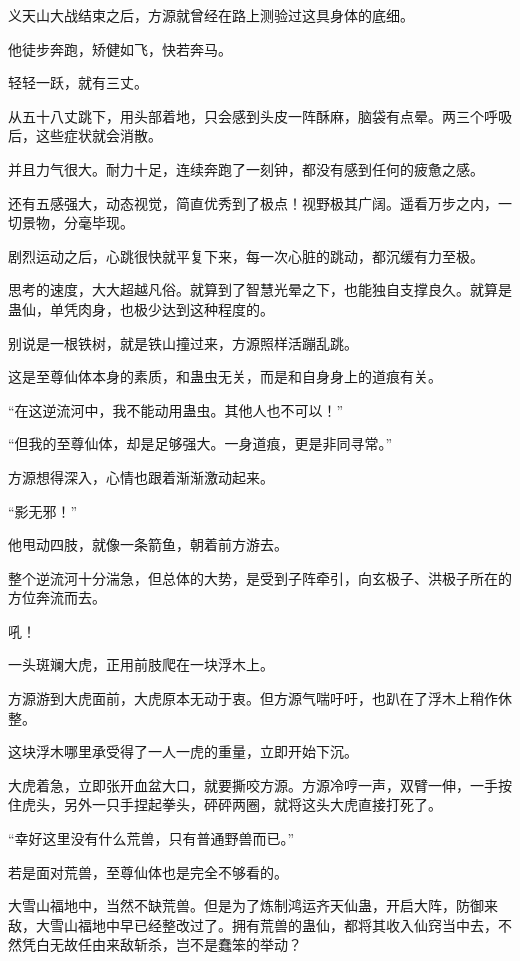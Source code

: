 
\begin{this_body}

义天山大战结束之后，方源就曾经在路上测验过这具身体的底细。

他徒步奔跑，矫健如飞，快若奔马。

轻轻一跃，就有三丈。

从五十八丈跳下，用头部着地，只会感到头皮一阵酥麻，脑袋有点晕。两三个呼吸后，这些症状就会消散。

并且力气很大。耐力十足，连续奔跑了一刻钟，都没有感到任何的疲惫之感。

还有五感强大，动态视觉，简直优秀到了极点！视野极其广阔。遥看万步之内，一切景物，分毫毕现。

剧烈运动之后，心跳很快就平复下来，每一次心脏的跳动，都沉缓有力至极。

思考的速度，大大超越凡俗。就算到了智慧光晕之下，也能独自支撑良久。就算是蛊仙，单凭肉身，也极少达到这种程度的。

别说是一根铁树，就是铁山撞过来，方源照样活蹦乱跳。

这是至尊仙体本身的素质，和蛊虫无关，而是和自身身上的道痕有关。

“在这逆流河中，我不能动用蛊虫。其他人也不可以！”

“但我的至尊仙体，却是足够强大。一身道痕，更是非同寻常。”

方源想得深入，心情也跟着渐渐激动起来。

“影无邪！”

他甩动四肢，就像一条箭鱼，朝着前方游去。

整个逆流河十分湍急，但总体的大势，是受到子阵牵引，向玄极子、洪极子所在的方位奔流而去。

吼！

一头斑斓大虎，正用前肢爬在一块浮木上。

方源游到大虎面前，大虎原本无动于衷。但方源气喘吁吁，也趴在了浮木上稍作休整。

这块浮木哪里承受得了一人一虎的重量，立即开始下沉。

大虎着急，立即张开血盆大口，就要撕咬方源。方源冷哼一声，双臂一伸，一手按住虎头，另外一只手捏起拳头，砰砰两圈，就将这头大虎直接打死了。

“幸好这里没有什么荒兽，只有普通野兽而已。”

若是面对荒兽，至尊仙体也是完全不够看的。

大雪山福地中，当然不缺荒兽。但是为了炼制鸿运齐天仙蛊，开启大阵，防御来敌，大雪山福地中早已经整改过了。拥有荒兽的蛊仙，都将其收入仙窍当中去，不然凭白无故任由来敌斩杀，岂不是蠢笨的举动？


\end{this_body}
